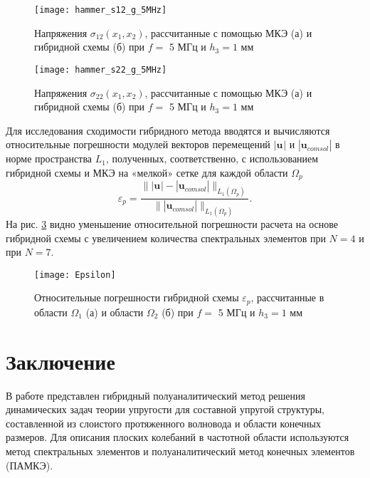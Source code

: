 \documentclass[press]{vestnik}
\begin{document}
\begin{figure}
	\begin{center}
		\texttt{[image: hammer\_s12\_g\_5MHz]}
		\caption{Напряжения $\sigma_{12}(x_{1},x_{2})$, рассчитанные с помощью МКЭ (а) и гибридной схемы (б) при $f=$ 5 МГц и $h_{3}=1$ мм} \label{s12}
	\end{center}
\end{figure}

\begin{figure}
	\begin{center}
		\texttt{[image: hammer\_s22\_g\_5MHz]}
		\caption{Напряжения $\sigma_{22}(x_{1},x_{2})$, рассчитанные с помощью МКЭ (а) и гибридной схемы (б) при $f=$ 5 МГц и $h_{3}=1$ мм} \label{s22}
	\end{center}
\end{figure}

Для исследования сходимости гибридного метода вводятся и вычисляются относительные погрешности модулей векторов перемещений $|{\bm{u_{}^{}}}|$ и $|{\bm{u}}_{comsol}^{}|$ в норме пространства $L_{1}$, полученных, соответственно, с использованием гибридной схемы и МКЭ на «мелкой» сетке для каждой области $\Omega_{p}$
$$
\varepsilon_{p} = \frac{\parallel |{\bm{u_{}^{}}}|-|{\bm{u}}_{comsol}^{}| \parallel_{L_{1}^{}(\Omega_{p})}^{}}{\parallel |{\bm{u}}_{comsol}^{}| \parallel_{L_{1}^{}(\Omega_{p})}^{}}.
$$
На рис. \ref{eps_p} видно уменьшение относительной погрешности расчета на основе гибридной схемы с увеличением количества спектральных элементов при $N=4$ и при $N=7$.
\begin{figure}
	\begin{center}
		\texttt{[image: Epsilon]} 
		\caption{Относительные погрешности гибридной схемы $\varepsilon_{p}$, рассчитанные в области $\Omega_{1}$ (а) и области $\Omega_{2}$ (б) при $f=$ 5 МГц и $h_{3}=1$ мм} \label{eps_p}
	\end{center}
\end{figure}


\section*{Заключение}
В работе представлен гибридный полуаналитический метод решения динамических задач теории упругости для составной упругой структуры, составленной из слоистого протяженного волновода и области конечных размеров. Для описания плоских колебаний в частотной области используются метод спектральных элементов и полуаналитический метод конечных элементов (ПАМКЭ).
\end{document}
